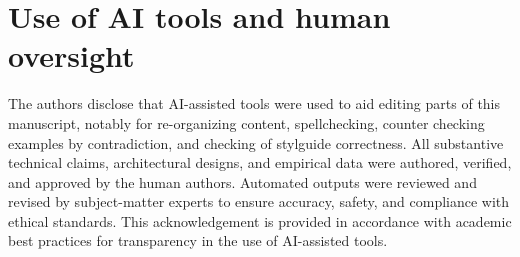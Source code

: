 \documentclass[11pt]{article}
\begin{document}
\section*{Use of AI tools and human oversight}
The authors disclose that AI-assisted tools were used to aid editing parts of this manuscript, notably for re-organizing content, spellchecking, counter checking examples by contradiction, and checking of stylguide correctness.
All substantive technical claims, architectural designs, and empirical data were authored, verified, and approved by the human authors.
Automated outputs were reviewed and revised by subject-matter experts to ensure accuracy, safety, and compliance with ethical standards.
This acknowledgement is provided in accordance with academic best practices for transparency in the use of AI-assisted tools.
\end{document}

